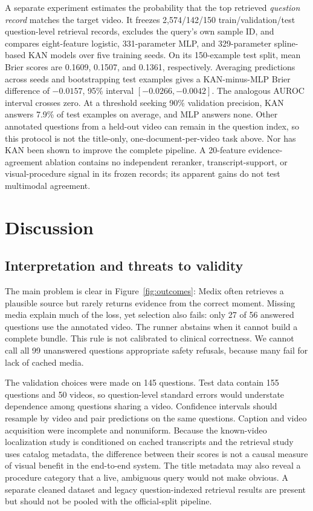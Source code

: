 \documentclass[sigconf,authorversion,nonacm]{acmart}
\begin{document}
A separate experiment estimates the probability that the top retrieved \emph{question record} matches the target video. It freezes 2,574/142/150 train/validation/test question-level retrieval records, excludes the query's own sample ID, and compares eight-feature logistic, 331-parameter MLP, and 329-parameter spline-based KAN models over five training seeds. On its 150-example test split, mean Brier scores are 0.1609, 0.1507, and 0.1361, respectively. Averaging predictions across seeds and bootstrapping test examples gives a KAN-minus-MLP Brier difference of \(-0.0157\), 95\% interval \([-0.0266,-0.0042]\). The analogous AUROC interval crosses zero. At a threshold seeking 90\% validation precision, KAN answers 7.9\% of test examples on average, and MLP answers none. Other annotated questions from a held-out video can remain in the question index, so this protocol is not the title-only, one-document-per-video task above. Nor has KAN been shown to improve the complete pipeline. A 20-feature evidence-agreement ablation contains no independent reranker, transcript-support, or visual-procedure signal in its frozen records; its apparent gains do not test multimodal agreement.

\section{Discussion}
\subsection{Interpretation and threats to validity}
The main problem is clear in Figure~\ref{fig:outcomes}: Medix often retrieves a plausible source but rarely returns evidence from the correct moment. Missing media explain much of the loss, yet selection also fails: only 27 of 56 answered questions use the annotated video. The runner abstains when it cannot build a complete bundle. This rule is not calibrated to clinical correctness. We cannot call all 99 unanswered questions appropriate safety refusals, because many fail for lack of cached media.

The validation choices were made on 145 questions. Test data contain 155 questions and 50 videos, so question-level standard errors would understate dependence among questions sharing a video. Confidence intervals should resample by video and pair predictions on the same questions. Caption and video acquisition were incomplete and nonuniform. Because the known-video localization study is conditioned on cached transcripts and the retrieval study uses catalog metadata, the difference between their scores is not a causal measure of visual benefit in the end-to-end system. The title metadata may also reveal a procedure category that a live, ambiguous query would not make obvious. A separate cleaned dataset and legacy question-indexed retrieval results are present but should not be pooled with the official-split pipeline.
\end{document}
